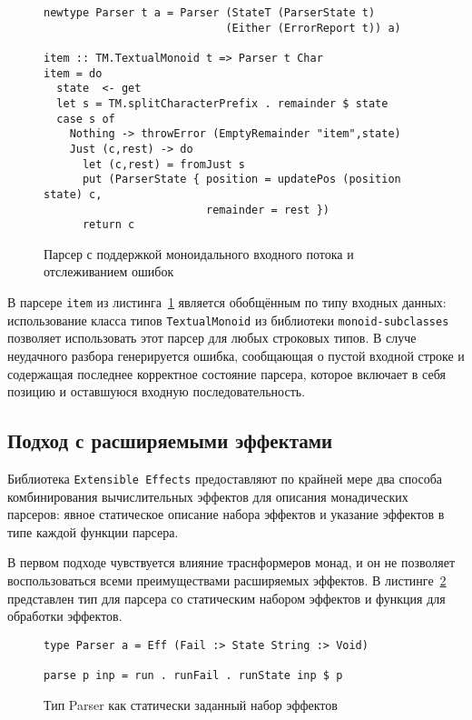 \begin{figure}[t]
\begin{lstlisting}
newtype Parser t a = Parser (StateT (ParserState t) 
                            (Either (ErrorReport t)) a)

item :: TM.TextualMonoid t => Parser t Char
item = do
  state  <- get
  let s = TM.splitCharacterPrefix . remainder $ state
  case s of
    Nothing -> throwError (EmptyRemainder "item",state)
    Just (c,rest) -> do
      let (c,rest) = fromJust s
      put (ParserState { position = updatePos (position state) c, 
                         remainder = rest })
      return c
\end{lstlisting}
\caption{Парсер с поддержкой моноидального входного потока и отслеживанием ошибок}
\label{listing:MonadTransItem2}
\end{figure}

В парсере \lstinline{item} из листинга~\ref{listing:MonadTransItem2} является 
обобщённым по типу входных данных: использование класса типов 
\lstinline{TextualMonoid} из библиотеки \lstinline{monoid-subclasses} позволяет
использовать этот парсер для любых строковых типов. В случе неудачного разбора 
генерируется ошибка, сообщающая о пустой входной строке и содержащая последнее
корректное состояние парсера, которое включает в себя позицию и оставшуюся 
входную последовательность.   

\subsection{Подход с расширяемыми эффектами}

Библиотека \lstinline{Extensible Effects} предоставляют по крайней мере два 
способа комбинирования вычислительных эффектов для описания монадических 
парсеров: явное статическое описание набора эффектов и указание эффектов в типе
каждой функции парсера.

В первом подходе чувствуется влияние траснформеров монад, и он не позволяет 
воспользоваться всеми преимуществами расширяемых эффектов. 
В листинге~\ref{listing:ExtEffectsParser} представлен тип для парсера со 
статическим набором эффектов и функция для обработки эффектов.

\begin{figure}[h]
\begin{lstlisting}
type Parser a = Eff (Fail :> State String :> Void)

parse p inp = run . runFail . runState inp $ p
\end{lstlisting}
\caption{Тип Parser как статически заданный набор эффектов}
\label{listing:ExtEffectsParser}
\end{figure}

